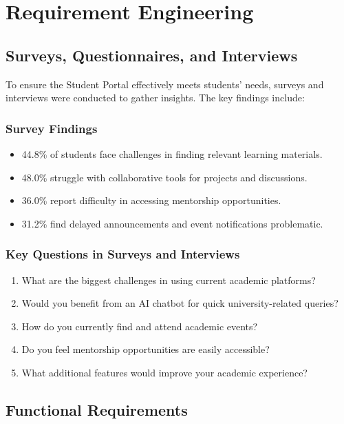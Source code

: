 
\chapter{Requirement Engineering}

\section{Surveys, Questionnaires, and Interviews}

To ensure the Student Portal effectively meets students' needs, surveys and interviews were conducted to gather insights. The key findings include:

\subsection*{Survey Findings}
\begin{itemize}
    \item 44.8\% of students face challenges in finding relevant learning materials.
    \item 48.0\% struggle with collaborative tools for projects and discussions.
    \item 36.0\% report difficulty in accessing mentorship opportunities.
    \item 31.2\% find delayed announcements and event notifications problematic.
\end{itemize}

\subsection*{Key Questions in Surveys and Interviews}
\begin{enumerate}
    \item What are the biggest challenges in using current academic platforms?
    \item Would you benefit from an AI chatbot for quick university-related queries?
    \item How do you currently find and attend academic events?
    \item Do you feel mentorship opportunities are easily accessible?
    \item What additional features would improve your academic experience?
\end{enumerate}

\section{Functional Requirements}

